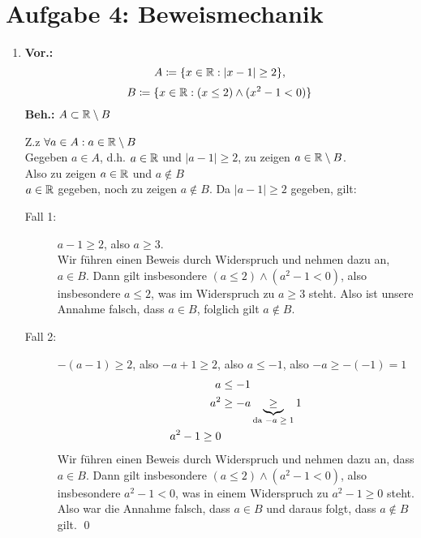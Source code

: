 \documentclass{gadsescript}
\begin{document}
\maketitle

\section*{Aufgabe 4: Beweismechanik}
\begin{enumerate}[label=\alph*)]
	\item \textbf{Vor.:}
		\[ A \coloneqq \{x \in \mathbb{R} : | x - 1 | \geq 2 \}, \]
		\[ B \coloneqq \{x \in \mathbb{R} : (x \leq 2) \wedge ( x^2 - 1 < 0) \} \]
		\textbf{Beh.:} $ A \subset \mathbb{R} \setminus B $
		\begin{proof*}
			Z.z $ \forall a \in A : a \in \mathbb{R} \setminus B $\\
			Gegeben $ a \in A $, d.h. $ a \in \mathbb{R} $ und $ | a - 1 | \geq 2 $, zu zeigen $ a \in \mathbb{R} \setminus B $.\\
			Also zu zeigen $ a \in \mathbb{R} $ und $ a \notin B $\\
			$ a \in \mathbb{R} $ gegeben, noch zu zeigen $ a \notin B $.
			Da $ | a - 1 | \geq 2 $ gegeben, gilt:\\
			\begin{description}
				\item[Fall 1:] $ a - 1 \geq 2 $, also $ a \geq 3 $.\\
					Wir führen einen Beweis durch Widerspruch und nehmen dazu an, $ a \in B $. Dann gilt insbesondere $ ( a \leq 2 ) \wedge ( a^2 - 1 < 0 ) $, also insbesondere $ a \leq 2 $, was im Widerspruch zu $ a \geq 3 $ steht. Also ist unsere Annahme falsch, dass $ a \in B $, folglich gilt $ a \notin B $.
				\item[Fall 2:] $ - ( a - 1 ) \geq 2 $, also $ -a  +1 \geq 2 $, also $ a \leq -1 $, also $ -a \geq -(-1) = 1 $
					\begin{align*}
						a &\leq -1\\
						a^2 &\geq -a \underbrace{\geq}_{\text{da $ -a \geq 1 $}} 1\\
						a^2 - 1 \geq 0
					\end{align*}
					Wir führen einen Beweis durch Widerspruch und nehmen dazu an, dass $ a \in B $. Dann gilt insbesondere $ ( a \leq 2 ) \wedge ( a^2 - 1 < 0 ) $, also insbesondere $ a^2 - 1 < 0 $, was in einem Widerspruch zu $ a^2 - 1 \geq 0 $ steht. Also war die Annahme falsch, dass $ a \in B $ und daraus folgt, dass $ a \notin B $ gilt. \qed
			\end{description}
		\end{proof*}

\end{enumerate}
\end{document}
